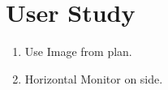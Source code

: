 \section{User Study}
\begin{enumerate}
	\item Use Image from plan.
	\item Horizontal Monitor on side. 
\end{enumerate}